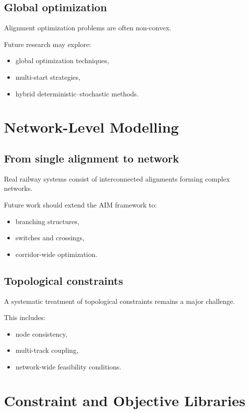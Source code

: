 \subsection{Global optimization}

Alignment optimization problems are often non-convex.

Future research may explore:
\begin{itemize}
\item global optimization techniques,
\item multi-start strategies,
\item hybrid deterministic--stochastic methods.
\end{itemize}


\section{Network-Level Modelling}

\subsection{From single alignment to network}

Real railway systems consist of interconnected alignments forming
complex networks.

Future work should extend the AIM framework to:
\begin{itemize}
\item branching structures,
\item switches and crossings,
\item corridor-wide optimization.
\end{itemize}

\subsection{Topological constraints}

A systematic treatment of topological constraints remains a major
challenge.

This includes:
\begin{itemize}
\item node consistency,
\item multi-track coupling,
\item network-wide feasibility conditions.
\end{itemize}


\section{Constraint and Objective Libraries}


